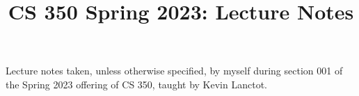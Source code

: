\documentclass[notes,minted]{agony}
\title{CS 350 Spring 2023: Lecture Notes}
\begin{document}
\renewcommand{\contentsname}{CS 350 Spring 2023:\\{\huge Lecture Notes}}
\thispagestyle{firstpage}
\tableofcontents

Lecture notes taken, unless otherwise specified,
by myself during section 001 of the Spring 2023 offering of CS 350,
taught by Kevin Lanctot.



\printindex
\end{document}
